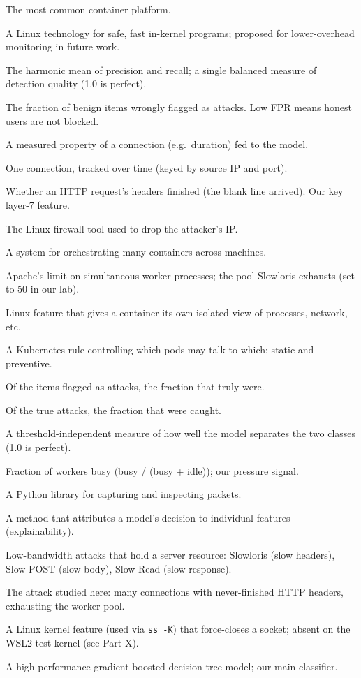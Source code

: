 \documentclass[11pt,a4paper]{article}
\begin{document}
\begin{description}[leftmargin=0pt,style=nextline]
  \item[Docker] The most common container platform.
  \item[eBPF] A Linux technology for safe, fast in-kernel programs; proposed for
  lower-overhead monitoring in future work.
  \item[F1 score] The harmonic mean of precision and recall; a single balanced
  measure of detection quality (1.0 is perfect).
  \item[False-positive rate (FPR)] The fraction of benign items wrongly flagged as
  attacks. Low FPR means honest users are not blocked.
  \item[Feature] A measured property of a connection (e.g.\ duration) fed to the
  model.
  \item[Flow] One connection, tracked over time (keyed by source IP and port).
  \item[Header completion] Whether an HTTP request's headers finished (the blank
  line arrived). Our key layer-7 feature.
  \item[iptables] The Linux firewall tool used to drop the attacker's IP.
  \item[Kubernetes] A system for orchestrating many containers across machines.
  \item[MaxRequestWorkers] Apache's limit on simultaneous worker processes; the
  pool Slowloris exhausts (set to 50 in our lab).
  \item[Namespaces] Linux feature that gives a container its own isolated view of
  processes, network, etc.
  \item[Network policy] A Kubernetes rule controlling which pods may talk to which;
  static and preventive.
  \item[Precision] Of the items flagged as attacks, the fraction that truly were.
  \item[Recall] Of the true attacks, the fraction that were caught.
  \item[ROC-AUC] A threshold-independent measure of how well the model separates
  the two classes (1.0 is perfect).
  \item[Saturation] Fraction of workers busy (busy / (busy + idle)); our pressure
  signal.
  \item[Scapy] A Python library for capturing and inspecting packets.
  \item[SHAP] A method that attributes a model's decision to individual features
  (explainability).
  \item[Slow-DoS family] Low-bandwidth attacks that hold a server resource:
  Slowloris (slow headers), Slow POST (slow body), Slow Read (slow response).
  \item[Slowloris] The attack studied here: many connections with never-finished
  HTTP headers, exhausting the worker pool.
  \item[SOCK\_DESTROY] A Linux kernel feature (used via \texttt{ss -K}) that
  force-closes a socket; absent on the WSL2 test kernel (see Part X).
  \item[XGBoost] A high-performance gradient-boosted decision-tree model; our main
  classifier.
\end{description}
\end{document}
